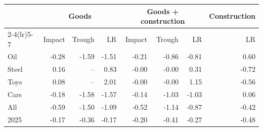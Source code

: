\begin{tabular}{lrrrrrrr}
\toprule
 & \multicolumn{3}{c}{Goods} & \multicolumn{3}{c}{Goods + construction} & Construction \\
\cmidrule(lr){2-4}\cmidrule(lr){5-7}
 & Impact & Trough & LR & Impact & Trough & LR & LR \\
\midrule
Oil & -0.28 & -1.59 & -1.51 & -0.21 & -0.86 & -0.81 & 0.60 \\
Steel & 0.16 & -- & 0.83 & -0.00 & -0.00 & 0.31 & -0.72 \\
Toys & 0.08 & -- & 2.01 & -0.00 & -0.00 & 1.15 & -0.56 \\
Cars & -0.18 & -1.58 & -1.57 & -0.14 & -1.03 & -1.03 & 0.06 \\
All & -0.59 & -1.50 & -1.09 & -0.52 & -1.14 & -0.87 & -0.42 \\
2025 & -0.17 & -0.36 & -0.17 & -0.20 & -0.41 & -0.27 & -0.48 \\
\bottomrule
\end{tabular}
